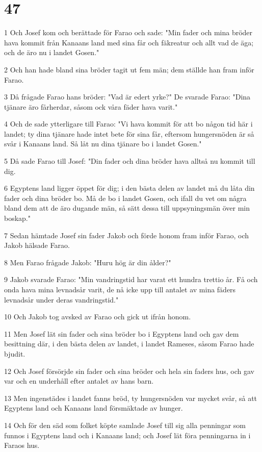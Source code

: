 \chapter{47}

\par 1 Och Josef kom och berättade för Farao och sade: "Min fader och mina bröder hava kommit från Kanaans land med sina får och fäkreatur och allt vad de äga; och de äro nu i landet Gosen."
\par 2 Och han hade bland sina bröder tagit ut fem män; dem ställde han fram inför Farao.
\par 3 Då frågade Farao hans bröder: "Vad är edert yrke?" De svarade Farao: "Dina tjänare äro fårherdar, såsom ock våra fäder hava varit."
\par 4 Och de sade ytterligare till Farao: "Vi hava kommit för att bo någon tid här i landet; ty dina tjänare hade intet bete för sina får, eftersom hungersnöden är så svår i Kanaans land. Så låt nu dina tjänare bo i landet Gosen."
\par 5 Då sade Farao till Josef: "Din fader och dina bröder hava alltså nu kommit till dig.
\par 6 Egyptens land ligger öppet för dig; i den bästa delen av landet må du låta din fader och dina bröder bo. Må de bo i landet Gosen, och ifall du vet om några bland dem att de äro dugande män, så sätt dessa till uppsyningsmän över min boskap."
\par 7 Sedan hämtade Josef sin fader Jakob och förde honom fram inför Farao, och Jakob hälsade Farao.
\par 8 Men Farao frågade Jakob: "Huru hög är din ålder?"
\par 9 Jakob svarade Farao: "Min vandringstid har varat ett hundra trettio år. Få och onda hava mina levnadsår varit, de nå icke upp till antalet av mina fäders levnadsår under deras vandringstid."
\par 10 Och Jakob tog avsked av Farao och gick ut ifrån honom.
\par 11 Men Josef lät sin fader och sina bröder bo i Egyptens land och gav dem besittning där, i den bästa delen av landet, i landet Rameses, såsom Farao hade bjudit.
\par 12 Och Josef försörjde sin fader och sina bröder och hela sin faders hus, och gav var och en underhåll efter antalet av hans barn.
\par 13 Men ingenstädes i landet fanns bröd, ty hungersnöden var mycket svår, så att Egyptens land och Kanaans land försmäktade av hunger.
\par 14 Och för den säd som folket köpte samlade Josef till sig alla penningar som funnos i Egyptens land och i Kanaans land; och Josef lät föra penningarna in i Faraos hus.
